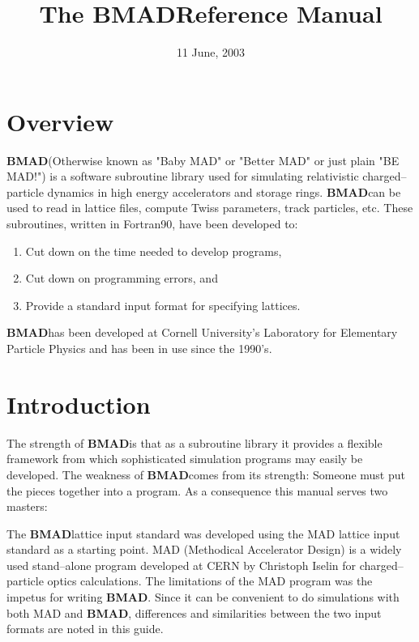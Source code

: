 \documentclass{book}
\newcommand{\bmad}{{\bf BMAD}}
\begin{document}
\title{The \bmad Reference Manual}

\date{11 June, 2003}
\maketitle

\section*{Overview}

\bmad (Otherwise known as "Baby MAD" or "Better MAD" or just plain "BE MAD!")
is a software subroutine library used for simulating 
relativistic charged--particle dynamics in high energy accelerators
and storage rings. \bmad can be used to read in lattice files, compute 
Twiss parameters, track particles, etc. 
These subroutines, written in  Fortran90, have been developed to:
\begin{enumerate}
\item Cut down on the time needed to develop programs,
\item Cut down on programming errors, and
\item Provide a standard input format for specifying lattices.
\end{enumerate}
\bmad has been developed at Cornell University's Laboratory for Elementary
Particle Physics and has been in use since the 1990's.
\vfill
\break
\section*{Introduction}

The strength of \bmad is that as a subroutine library it provides a flexible
framework from which sophisticated simulation programs may easily be developed.
The weakness of \bmad comes from its strength: Someone must put the pieces 
together into a program. As a consequence this manual serves two masters:

The \bmad lattice input standard was developed using the MAD lattice
input standard as a starting point. MAD (Methodical Accelerator
Design) is a widely used stand--alone program developed at CERN by
Christoph Iselin for charged--particle optics calculations. The
limitations of the MAD program was the impetus for writing
\bmad. Since it can be convenient to do simulations with both MAD and
\bmad, differences and similarities between the two input formats are
noted in this guide.
\end{document}
